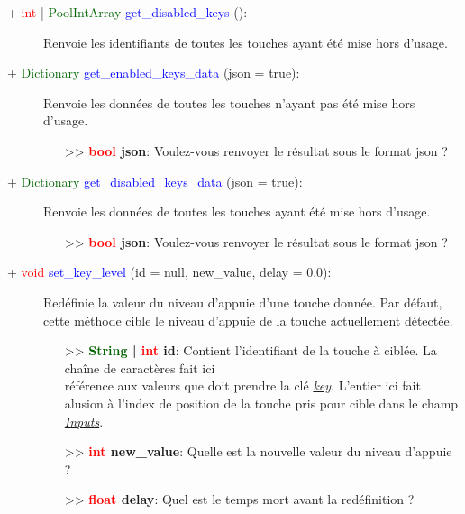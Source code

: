 \documentclass[a4paper, 11pt]{article}
\begin{document}
	\begin{description}
		\item [+ \textcolor{red}{int} | \textcolor{darkgreen}{PoolIntArray} \textcolor{blue}
		{get\_disabled\_keys} ():] Renvoie les identifiants de toutes les touches ayant été mise hors 
		d'usage.\\
	\end{description}
	\begin{description}
		\item [+ \textcolor{darkgreen}{Dictionary} \textcolor{blue}{get\_enabled\_keys\_data} (json = 
		true):] Renvoie les données de toutes les touches n'ayant pas été mise hors d'usage.
		\begin{itemize}
			\item [>> \textbf{\textcolor{red}{bool} json}:] Voulez-vous renvoyer le résultat sous le format 
			json ?\\
		\end{itemize}
	\end{description}
	\begin{description}
		\item [+ \textcolor{darkgreen}{Dictionary} \textcolor{blue}{get\_disabled\_keys\_data} (json = 
		true):] Renvoie les données de toutes les touches ayant été mise hors d'usage.
		\begin{itemize}
			\item [>> \textbf{\textcolor{red}{bool} json}:] Voulez-vous renvoyer le résultat sous le format 
			json ?\\
		\end{itemize}
	\end{description}
	\begin{description}
		\item [+ \textcolor{red}{void} \textcolor{blue}{set\_key\_level} (id = null, new\_value, delay = 
		0.0):] Redéfinie la valeur du niveau d'appuie d'une touche donnée. Par défaut, cette méthode cible
		le niveau d'appuie de la touche actuellement détectée.
		\begin{itemize}
			\item [>> \textbf{\textcolor{darkgreen}{String} | \textcolor{red}{int} id}:] Contient 
			l'identifiant de la touche à ciblée. La chaîne de caractères fait ici \\référence aux valeurs 
			que doit prendre la clé \textit{\hyperlink{key}{key}}. L'entier ici fait alusion à l'index de 
			position de la touche pris pour cible dans le champ \textit{\hyperlink{inputs}{Inputs}}.
			\item [>> \textbf{\textcolor{red}{int} new\_value}:] Quelle est la nouvelle valeur du niveau 
			d'appuie ?
			\item [>> \textbf{\textcolor{red}{float} delay}:] Quel est le temps mort avant la redéfinition ? 
			\\
		\end{itemize}
	\end{description}
\end{document}
